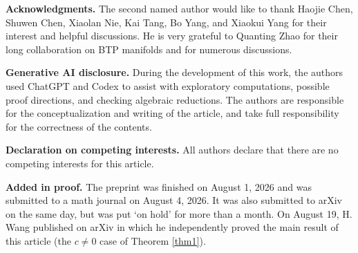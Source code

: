 \documentclass{amsart}
\begin{document}
\vspace{0.6cm}

\noindent\textbf{Acknowledgments.}
The second named author would like to thank Haojie Chen, Shuwen Chen, Xiaolan Nie, Kai Tang, Bo Yang, and Xiaokui Yang for their interest and helpful discussions. He is very grateful to Quanting Zhao for their long collaboration on BTP manifolds and for numerous discussions.


\vspace{0.3cm}

\noindent\textbf{Generative AI disclosure.}
During the development of this work, the authors used ChatGPT and Codex to assist with exploratory computations, possible proof directions, and checking algebraic reductions. The authors are responsible for the conceptualization and writing of the article, and take full responsibility for the correctness of the contents.

\vspace{0.3cm}

\noindent\textbf{Declaration on competing interests.}
All authors declare that there are no competing interests for this article.


\vspace{0.3cm}

\noindent\textbf{Added in proof.}
The preprint was finished on August 1, 2026 and was submitted to a math journal on August 4, 2026. It was also  submitted to arXiv on the same day, but was put `on hold' for more than a month. On August 19, H. Wang published \cite{HWang} on arXiv in which he independently proved the main result of this article (the $c\neq 0$ case of Theorem \ref{thm1}).




\vspace{0.3cm}
\end{document}
